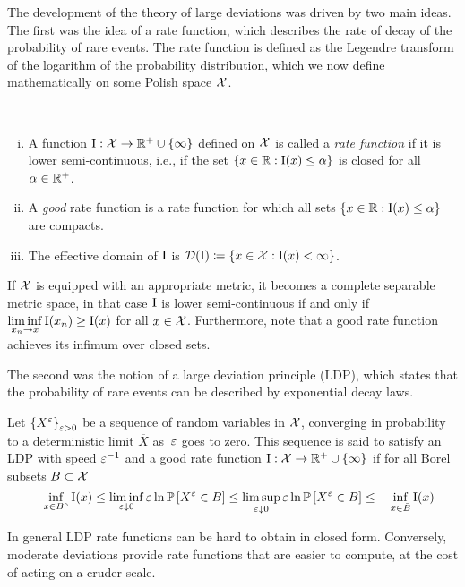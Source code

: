 The development of the theory of large deviations was driven by two main ideas. The first was the idea of a rate function, which describes the rate of decay of the probability of rare events. The rate function is defined as the Legendre transform of the logarithm of the probability distribution, which we now define mathematically on some Polish space $\mathcal{X}$.
\begin{definition}\ 
\begin{enumerate}[i)]
    \item A function $\mathrm{I}: \mathcal{X} \to \mathbb{R}^+ \cup \{\infty\}$ defined on $\mathcal{X}$ is called a \emph{rate function} if it is lower semi-continuous, i.e., if the set $\{ x \in \mathbb{R}: \mathrm{I} (x) \leq \alpha \}$ is closed for all $\alpha \in \mathbb{R}^+$.
    \item A \emph{good} rate function is a rate function for which all sets $\{ x \in \mathbb{R} : \mathrm{I} (x) \leq \alpha \}$ are compacts.
    \item The effective domain of $\mathrm{I}$ is $\mathcal{D}(\mathrm{I}) \coloneqq \{x \in \mathcal{X} : \mathrm{I}(x) < \infty \}$. 
\end{enumerate}
\end{definition}
\begin{remark}
If $\mathcal{X}$ is equipped with an appropriate metric, it becomes a complete separable metric space, in that case $\mathrm{I}$ is lower semi-continuous if and only if $\liminf\limits_{x_n \rightarrow x} \mathrm{I}(x_n) \geq \mathrm{I}(x)$ for all $x \in \mathcal{X}$. Furthermore, note that a good rate function achieves its infimum over closed sets.
\end{remark}
The second was the notion of a large deviation principle (LDP), which states that the probability of rare events can be described by exponential decay laws.
\begin{definition}
Let $\left\{X^{\varepsilon}\right\}_{\varepsilon>0}$ be a sequence of random variables in $\mathcal{X}$, converging in probability to a deterministic limit $\overline{X}$ as~$\varepsilon$ goes to zero. This sequence is said to satisfy an LDP with speed $\varepsilon^{-1}$ and a good rate function $\mathrm{I}: \mathcal{X} \to \mathbb{R}^+ \cup \{\infty\}$ if for all Borel subsets $B \subset \mathcal{X}$
$$
-\inf _{x \in B^{\circ}} \mathrm{I}(x) \leq \liminf _{\varepsilon \downarrow 0} \varepsilon \ln \mathbb{P}\left[X^{\varepsilon} \in B\right] \leq \limsup _{\varepsilon \downarrow 0} \varepsilon \ln \mathbb{P}\left[X^{\varepsilon} \in B\right] \leq-\inf _{x \in \bar{B}} \mathrm{I}(x)
$$
\end{definition}

In general LDP rate functions can be hard to obtain in closed form. Conversely, moderate deviations provide rate functions that are easier to compute, at the cost of acting on a cruder scale.

